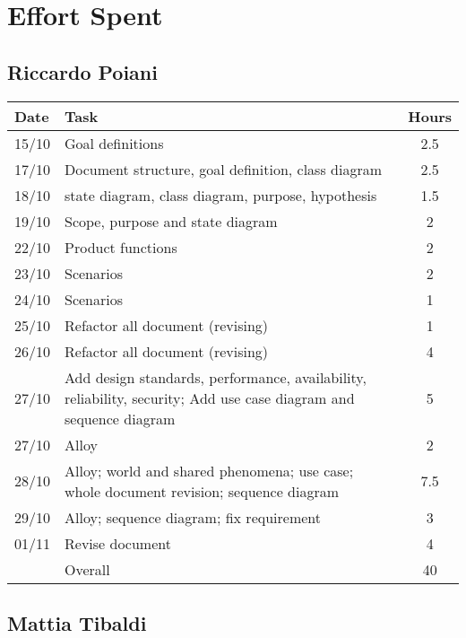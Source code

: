 
\section{Effort Spent}

\subsection{Riccardo Poiani}

\begin{table}[H]
\begin{tabularx}{\textwidth}{|l|X|c|}
\hline
\rowcolor[HTML]{C0C0C0} 
Date & Task & Hours\\ \hline
15/10 & Goal definitions & 2.5\\ \hline
17/10 & Document structure, goal definition, class diagram & 2.5\\ \hline
18/10 & state diagram, class diagram, purpose, hypothesis & 1.5\\ \hline
19/10 & Scope, purpose and state diagram & 2\\ \hline
22/10 & Product functions & 2\\ \hline
23/10 & Scenarios & 2\\ \hline
24/10 & Scenarios & 1\\ \hline
25/10 & Refactor all document (revising) & 1\\ \hline
26/10 & Refactor all document (revising) & 4\\ \hline
27/10 & Add design standards, performance, availability, reliability, security; Add use case diagram and sequence diagram & 5\\ \hline
27/10 & Alloy & 2\\ \hline
28/10 & Alloy; world and shared phenomena; use case; whole document revision; sequence diagram & 7.5  \\ \hline
29/10 & Alloy; sequence diagram; fix requirement& 3 \\ \hline
01/11 & Revise document & 4 \\ \hline 
\rowcolor[HTML]{C0C0C0} 
& Overall & 40 \\ \hline
\end{tabularx}
\end{table}

\subsection{Mattia Tibaldi}

